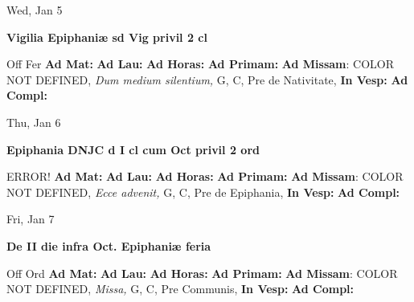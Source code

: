 \documentclass[10pt]{book}
\begin{document}
\begin{center}
\begin{minipage}{3.5in}
\vspace{2em}
\begin{center}Wed, Jan 5
\end{center}
\textbf{ \large Vigilia Epiphaniæ
\textnormal{\normalsize sd Vig privil 2 cl}}

\begin{justify}Off Fer
\textbf{Ad Mat: }
\textbf{Ad Lau: }
\textbf{Ad Horas: }
\textbf{Ad Primam: }\textbf{Ad Missam}: COLOR NOT DEFINED, \textit{Dum medium silentium,} G, C, Pre de Nativitate, 
\textbf{In Vesp: }
\textbf{Ad Compl: }
\end{justify}
\end{minipage}
\end{center}

\begin{center}
\begin{minipage}{3.5in}
\vspace{2em}
\begin{center}Thu, Jan 6
\end{center}
\textbf{ \large Epiphania DNJC
\textnormal{\normalsize d I cl cum Oct privil 2 ord}}

\begin{justify}ERROR!
\textbf{Ad Mat: }
\textbf{Ad Lau: }
\textbf{Ad Horas: }
\textbf{Ad Primam: }\textbf{Ad Missam}: COLOR NOT DEFINED, \textit{Ecce advenit,} G, C, Pre de Epiphania, 
\textbf{In Vesp: }
\textbf{Ad Compl: }
\end{justify}
\end{minipage}
\end{center}

\begin{center}
\begin{minipage}{3.5in}
\vspace{2em}
\begin{center}Fri, Jan 7
\end{center}
\textbf{ \large De II die infra Oct. Epiphaniæ
\textnormal{\normalsize feria}}

\begin{justify}Off Ord
\textbf{Ad Mat: }
\textbf{Ad Lau: }
\textbf{Ad Horas: }
\textbf{Ad Primam: }\textbf{Ad Missam}: COLOR NOT DEFINED, \textit{Missa,} G, C, Pre Communis, 
\textbf{In Vesp: }
\textbf{Ad Compl: }
\end{justify}
\end{minipage}
\end{center}
\end{document}
